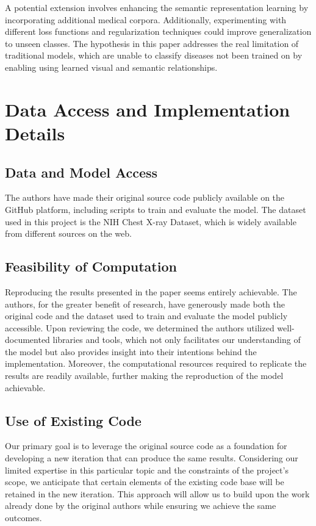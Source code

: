 \documentclass[letterpaper]{article} %
\begin{document}
A potential extension involves enhancing the semantic representation learning by
incorporating additional medical corpora. Additionally, experimenting with different
loss functions and regularization techniques could improve generalization to
unseen classes. The hypothesis in this paper addresses the real limitation of
traditional models, which are unable to classify diseases not been trained on by
enabling using learned visual and semantic relationships.

\section{Data Access and Implementation Details}

\subsection{Data and Model Access}

The authors have made their original source code publicly available on the GitHub
platform, including scripts to train and evaluate the model. The dataset used in this
project is the NIH Chest X-ray Dataset, which is widely available from different
sources on the web.

\subsection{Feasibility of Computation}

Reproducing the results presented in the paper seems entirely achievable. The authors, for the greater benefit of research, have generously made both the original code and the dataset used to train and evaluate the model publicly accessible. Upon reviewing the code, we determined the authors utilized well-documented libraries and tools, which not only facilitates our understanding of the model but also provides insight into their intentions behind the implementation. Moreover, the computational resources required to replicate the results are readily available, further making the reproduction of the model achievable.

\subsection{Use of Existing Code}

Our primary goal is to leverage the original source code as a foundation for developing a new iteration that can produce the same results. Considering our limited expertise in this particular topic and the constraints of the project's scope, we anticipate that certain elements of the existing code base will be retained in the new iteration. This approach will allow us to build upon the work already done by the original authors while ensuring we achieve the same outcomes.

% 
\end{document}
